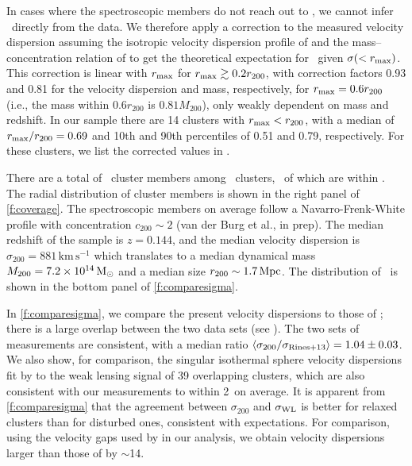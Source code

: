 In cases where the spectroscopic members do not reach out to \radius, we cannot infer \vdisp\ 
directly from the data. We therefore apply a correction to the measured velocity dispersion 
assuming the isotropic velocity dispersion profile of \cite{mamon10} and the mass--concentration 
relation of \cite{duffy08} to get the theoretical expectation for \vdisp\ given $\sigma(<r_{\rm 
max})$. This correction is linear with $r_{\rm max}$ for $r_{\rm max} \gtrsim 0.2 r_{200}$, with 
correction factors 0.93 and 0.81 for the velocity dispersion and mass, respectively, for $r_{\rm 
max}=0.6r_{200}$ (i.e., the mass within $0.6r_{200}$ is $0.81M_{200}$), only weakly dependent on 
mass and redshift. In our sample there are 14 clusters with $r_{\rm max}<r_{200}$, with a median of 
$r_{\rm max}/r_{200}=0.69$ and 10th and 90th percentiles of 0.51 and 0.79, respectively. For these 
clusters, we list the corrected values in \Cref{t:dynamics}.

There are a total of \Nmembers\ cluster members among \Ncl\ clusters, \Nwithinr\ of which are 
within \radius. The radial distribution of cluster members is shown in the right panel of 
\cref{f:coverage}. The spectroscopic members on average follow a Navarro-Frenk-White 
\citep[NFW,][]{navarro95} profile with concentration $c_{200}\sim 2$ (van der Burg et al., in 
prep). The median redshift of the sample is $z=0.144$, and the median velocity dispersion is 
$\sigma_{200}=881\,\mathrm{km\,s^{-1}}$ which translates to a median dynamical mass 
$M_{200}=7.2\times10^{14}\,{\rm M}_\odot$ and a median size $r_{200}\sim1.7\,{\rm Mpc}$. The distribution 
of \vdisp\ is shown in the bottom panel of \cref{f:comparesigma}.

In \cref{f:comparesigma}, we compare the present velocity dispersions to those of \cite{rines13}; 
there is a large overlap between the two data sets (see \Cref{t:catalogs}). The two sets of 
measurements are consistent, with a median ratio $\langle\sigma_{200}/\sigma_{\rm 
Rines+13}\rangle=1.04\pm0.03$. We also show, for comparison, the singular isothermal sphere 
velocity dispersions fit by \cite{hoekstra12} to the weak lensing signal of 39 overlapping 
clusters, which are also consistent with our measurements to within 2\percent\ on average. It is apparent 
from \cref{f:comparesigma} that the agreement between $\sigma_{200}$ and $\sigma_{\rm WL}$ is 
better 
for relaxed clusters than for disturbed ones, consistent with expectations. For comparison, using 
the velocity gaps used by \cite{sifon13} in our analysis, we obtain velocity dispersions larger 
than those of \cite{rines13} by $\sim$14\percent.


